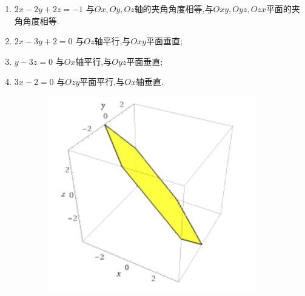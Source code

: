 \begin{solution}
    \begin{enumerate}
        \item $2x - 2y + 2z =-1$ 与$Ox,Oy,Oz$轴的夹角角度相等,与$Oxy,Oyz,Ozx$平面的夹角角度相等.
        \item $2x - 3y + 2 = 0$ 与$Oz$轴平行,与$Oxy$平面垂直;
        \item $y - 3z = 0$ 与$Ox$轴平行,与$Oyz$平面垂直;
        \item $3x - 2 = 0$ 与$Ozy$平面平行,与$Ox$轴垂直.
    \end{enumerate}

    \begin{figure}[htbp]
      \centering
      \begin{subfigure}{0.23\textwidth}
        \centering
        \includegraphics[width=\linewidth]{figure/1-3.png}
      \end{subfigure} \hfill
      \begin{subfigure}{0.23\textwidth}
        \centering

\end{subfigure}
\end{figure}
\end{solution}
